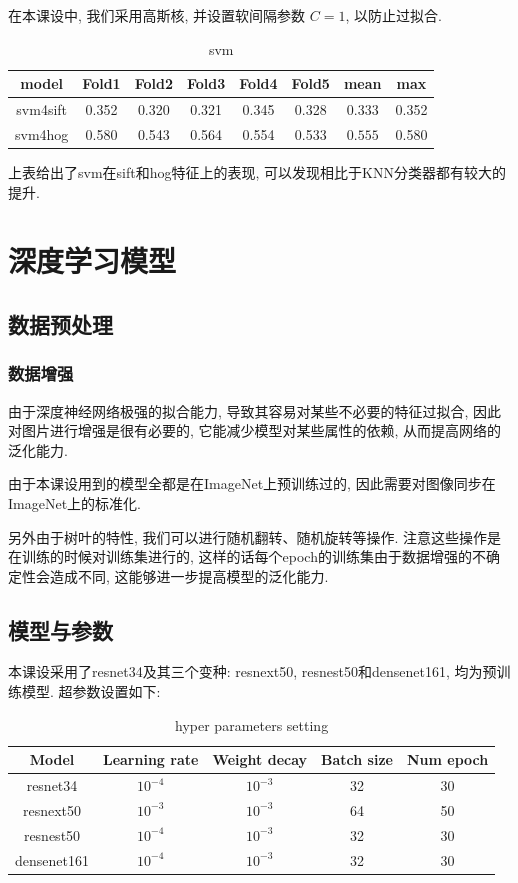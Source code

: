 \documentclass[lang=cn,12pt,a4paper,cite=authoryear]{elegantpaper}
\begin{document}
在本课设中, 我们采用高斯核, 并设置软间隔参数 $C=1$, 以防止过拟合.

\begin{table}[t]
    \centering
    \begin{tabular}{cccccccc}
    \hline
    model & Fold1 & Fold2 & Fold3 & Fold4 & Fold5 & mean & max\\
    \hline
    svm4sift & 0.352 & 0.320 & 0.321 & 0.345 & 0.328 & $\mathbf{0.333}$ & 0.352\\
    svm4hog & 0.580 & 0.543 & 0.564 & 0.554 & 0.533 & $\mathbf{0.555}$ & 0.580\\
    \hline
    \end{tabular}
    \caption{svm}
\end{table}

上表给出了svm在sift和hog特征上的表现, 可以发现相比于KNN分类器都有较大的提升.

\section{深度学习模型}
\subsection{数据预处理}
\subsubsection{数据增强}
由于深度神经网络极强的拟合能力, 导致其容易对某些不必要的特征过拟合, 因此对图片进行增强是很有必要的, 它能减少模型对某些属性的依赖, 从而提高网络的泛化能力.

由于本课设用到的模型全都是在ImageNet上预训练过的, 因此需要对图像同步在ImageNet上的标准化.

另外由于树叶的特性, 我们可以进行随机翻转、随机旋转等操作. 注意这些操作是在训练的时候对训练集进行的, 这样的话每个epoch的训练集由于数据增强的不确定性会造成不同, 这能够进一步提高模型的泛化能力.
\subsection{模型与参数}
本课设采用了resnet34及其三个变种: resnext50, resnest50和densenet161, 均为预训练模型.
超参数设置如下:
\begin{table}[ht]
    \centering
    \begin{tabular}{ccccc}
    \hline
    Model & Learning rate & Weight decay & Batch size & Num epoch\\
    \hline
    resnet34 & $10^{-4}$ & $10^{-3}$ & 32 & 30\\
    resnext50 & $10^{-3}$ & $10^{-3}$ & 64 & 50\\
    resnest50 & $10^{-4}$ & $10^{-3}$ & 32 & 30\\
    densenet161 & $10^{-4}$ & $10^{-3}$ & 32 & 30\\
    \hline
    \end{tabular}
    \caption{hyper parameters setting}
    \label{tab:example}
    \end{table}
\end{document}
